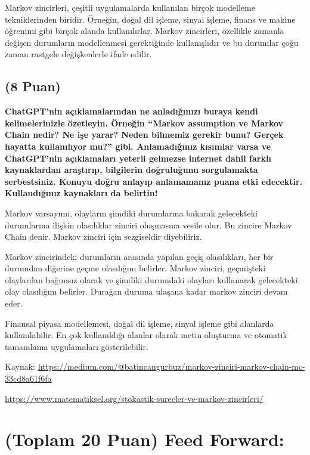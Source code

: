 \documentclass[11pt]{article}
\begin{document}
    Markov zincirleri, çeşitli uygulamalarda kullanılan birçok modelleme tekniklerinden biridir. Örneğin, doğal dil işleme, sinyal işleme, finans ve makine öğrenimi gibi birçok alanda kullanılırlar. Markov zincirleri, özellikle zamanla değişen durumların modellenmesi gerektiğinde kullanışlıdır ve bu durumlar çoğu zaman rastgele değişkenlerle ifade edilir.

\subsection{(8 Puan)} \textbf{ChatGPT’nin açıklamalarından ne anladığınızı buraya kendi kelimelerinizle özetleyin. Örneğin ``Markov assumption ve Markov Chain nedir? Ne işe yarar? Neden bilmemiz gerekir bunu? Gerçek hayatta kullanılıyor mu?'' gibi. Anlamadığınız kısımlar varsa ve ChatGPT’nin açıklamaları yeterli gelmezse internet dahil farklı kaynaklardan araştırıp, bilgilerin doğruluğunu sorgulamakta serbestsiniz. Konuyu doğru anlayıp anlamamanız puana etki edecektir. Kullandığınız kaynakları da belirtin!}

    Markov varsayımı, olayların şimdiki durumlarına bakarak gelecekteki durumlarına ilişkin olasılıklar zinciri oluşmasına vesile olur. Bu zincire Markov Chain denir. Markov zinciri için sezgiseldir diyebiliriz.

    Markov zincirindeki durumların arasında yapılan geçiş olasılıkları, her bir durumdan diğerine geçme olasılığını belirler. Markov zinciri, geçmişteki olaylardan bağımsız olarak ve şimdiki durumdaki olayları kullanarak gelecekteki olay olasılığını belirler. Durağan duruma ulaşana kadar markov zinciri devam eder.

    Finansal piyasa modellemesi, doğal dil işleme, sinyal işleme gibi alanlarda kullanılabilir. En çok kullanıldığı alanlar olarak metin oluşturma ve otomatik tamamlama uygulamaları gösterilebilir.

Kaynak: \url{https://medium.com/@batincangurbuz/markov-zinciri-markov-chain-mc-33cd8a61f6fa}

        \url{https://www.matematiksel.org/stokastik-surecler-ve-markov-zincirleri/}

\section{(Toplam 20 Puan) Feed Forward:}
 
\end{document}
